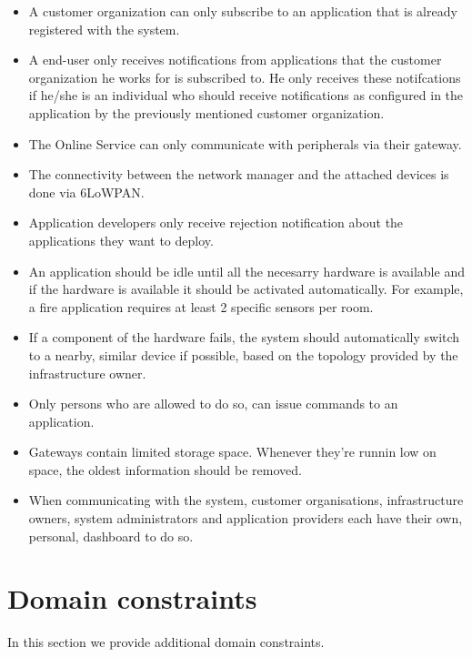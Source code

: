 \documentclass[english,peerreview]{sareport}
\begin{document}
\begin{itemize}
    \item A customer organization can only subscribe to an application that is already registered with the system.
    \item A end-user only receives notifications from applications that the customer organization he works for is subscribed to. He only receives these notifcations if he/she is an individual who should receive notifications as configured in the application by the previously mentioned customer organization.
    \item The Online Service can only communicate with peripherals via their gateway.
    \item The connectivity between the network manager and the attached devices is done via 6LoWPAN.
    \item Application developers only receive rejection notification about the applications they want to deploy.
    \item An application should be idle until all the necesarry hardware is available and if the hardware is available it should be activated automatically. For example, a fire application requires at least 2 specific sensors per room.
    \item If a component of the hardware fails, the system should automatically switch to a nearby, similar device if possible, based on the topology provided by the infrastructure owner.
    \item Only persons who are allowed to do so, can issue commands to an application.
    \item Gateways contain limited storage space. Whenever they're runnin low on space, the oldest information should be removed.
    \item When communicating with the system, customer organisations, infrastructure owners, system administrators and application providers each have their own, personal, dashboard to do so.
\end{itemize}

\section{Domain constraints}
In this section we provide additional domain constraints.
\end{document}
